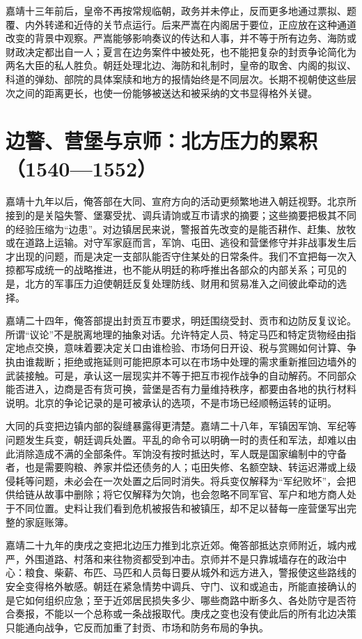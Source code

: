 嘉靖十三年前后，皇帝不再按常规临朝，政务并未停止，反而更多地通过票拟、题覆、内外转递和近侍的关节点运行。后来严嵩在内阁居于要位，正应放在这种通道改变的背景中观察。严嵩能够影响奏议的传达和人事，并不等于所有边务、海防或财政决定都出自一人；夏言在边务案件中被处死，也不能把复杂的封贡争论简化为两名大臣的私人胜负。朝廷处理北边、海防和礼制时，皇帝的取舍、内阁的拟议、科道的弹劾、部院的具体案牍和地方的报情始终是不同层次。长期不视朝使这些层次之间的距离更长，也使一份能够被送达和被采纳的文书显得格外关键。

\section{边警、营堡与京师：北方压力的累积（1540—1552）}

嘉靖十九年以后，俺答部在大同、宣府方向的活动更频繁地进入朝廷视野。北京所接到的是关隘失警、堡寨受扰、调兵请饷或互市请求的摘要；这些摘要把极其不同的经验压缩为“边患”。对边镇居民来说，警报首先改变的是能否耕作、赶集、放牧或在道路上运输。对守军家庭而言，军饷、屯田、逃役和营堡修守并非战事发生后才出现的问题，而是决定一支部队能否守住某处的日常条件。我们不宜把每一次入掠都写成统一的战略推进，也不能从明廷的称呼推出各部众的内部关系；可见的是，北方的军事压力迫使朝廷反复处理防线、财用和贸易准入之间彼此牵动的选择。

嘉靖二十四年，俺答部提出封贡互市要求，明廷围绕受封、贡市和边防反复议论。所谓“议论”不是脱离地理的抽象对话。允许特定人员、特定马匹和特定货物经由指定地点交换，意味着要决定关口由谁检验、市场何日开设、税与赏赐如何计算、争执由谁裁断；拒绝或拖延则可能把原本可以在市场中处理的需求重新推回边墙外的武装接触。可是，承认这一层现实并不等于把互市视作战争的自动解药。不同部众能否进入，边商是否有货可换，营堡是否有力量维持秩序，都要由各地的执行材料说明。北京的争论记录的是可被承认的选项，不是市场已经顺畅运转的证明。

大同的兵变把边镇内部的裂缝暴露得更清楚。嘉靖二十八年，军镇因军饷、军纪等问题发生兵变，朝廷调兵处置。平乱的命令可以明确一时的责任和军法，却难以由此消除造成不满的全部条件。军饷没有按时抵达时，军人既是国家编制中的守备者，也是需要购粮、养家并偿还债务的人；屯田失修、名额空缺、转运迟滞或上级侵耗等问题，未必会在一次处置之后同时消失。将兵变仅解释为“军纪败坏”，会把供给链从故事中删除；将它仅解释为欠饷，也会忽略不同军官、军户和地方商人处于不同位置。史料让我们看到危机被报告和被镇压，却不足以替每一座营堡写出完整的家庭账簿。

嘉靖二十九年的庚戌之变把北边压力推到北京近郊。俺答部抵达京师附近，城内戒严，外围道路、村落和来往物资都受到冲击。京师并不是只靠城墙存在的政治中心：粮食、柴薪、布匹、马匹和人员每日要从城外和远方进入，警报使这些路线的安全变得格外敏感。朝廷在紧急情势中调兵、守门、议和或追击，所能直接确认的是它如何组织应急；至于近郊居民损失多少、哪些商路中断多久、各处防守是否符合奏报，不能以一个总称或一条战报取代。庚戌之变也没有使此后的所有北边决策只能通向战争，它反而加重了封贡、市场和防务布局的争执。

